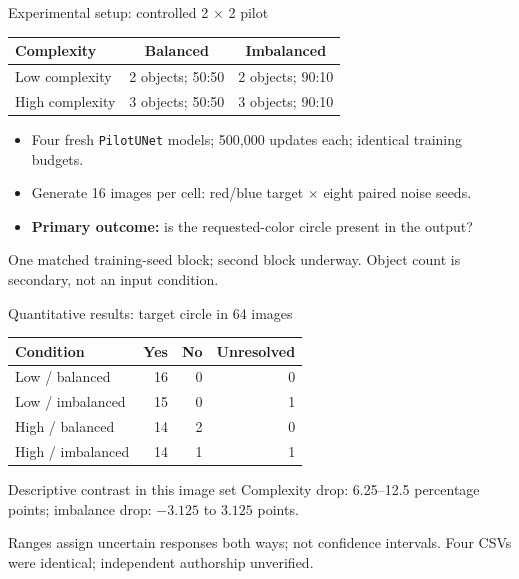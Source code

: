 \documentclass[aspectratio=169,11pt]{beamer}
\newcommand{\smallnote}[1]{{\par\vspace{1.5mm}\scriptsize\color{gray!80!black}#1\par}}
\begin{document}
\begin{frame}{Experimental setup: controlled 2 $\times$ 2 pilot}
\begin{center}
\renewcommand{\arraystretch}{1.2}
\begin{tabular}{lcc}
\toprule
\textbf{Complexity} & \textbf{Balanced} & \textbf{Imbalanced} \\
\midrule
Low complexity & 2 objects; 50:50 & 2 objects; 90:10 \\
High complexity & 3 objects; 50:50 & 3 objects; 90:10 \\
\bottomrule
\end{tabular}
\end{center}

\vspace{1mm}
\begin{itemize}
  \setlength{\itemsep}{3pt}
  \item Four fresh \texttt{PilotUNet} models; 500,000 updates each; identical training budgets.
  \item Generate 16 images per cell: red/blue target $\times$ eight paired noise seeds.
  \item \textbf{Primary outcome:} is the requested-color circle present in the output?
\end{itemize}

\vfill
\smallnote{One matched training-seed block; second block underway. Object count is secondary, not an input condition.}
\end{frame}

\begin{frame}{Quantitative results: target circle in 64 images}
\begin{center}
\renewcommand{\arraystretch}{1.1}
\small
\begin{tabular}{lrrr}
\toprule
\textbf{Condition} & \textbf{Yes} & \textbf{No} & \textbf{Unresolved} \\
\midrule
Low / balanced    & 16 & 0 & 0 \\
Low / imbalanced  & 15 & 0 & 1 \\
High / balanced   & 14 & 2 & 0 \\
High / imbalanced & 14 & 1 & 1 \\
\bottomrule
\end{tabular}
\end{center}

\vspace{1mm}
\begin{block}{Descriptive contrast in this image set}
\small Complexity drop: 6.25--12.5 percentage points; imbalance drop: $-3.125$ to $3.125$ points.
\end{block}

\vfill
\smallnote{Ranges assign uncertain responses both ways; not confidence intervals. Four CSVs were identical; independent authorship unverified.}
\end{frame}
\end{document}
